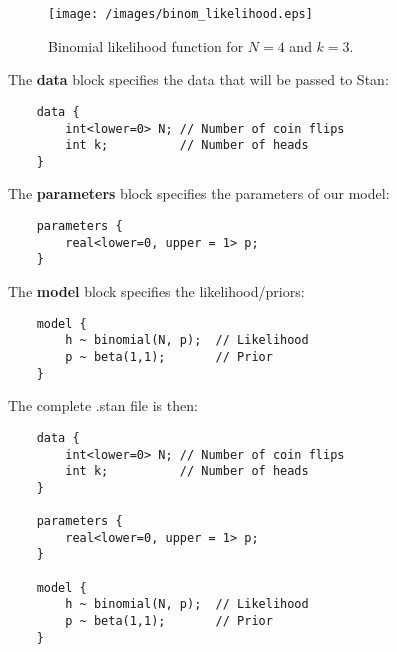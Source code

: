 \documentclass{beamer}
\begin{document}
\begin{frame}
    \begin{figure}
    \centering
        \texttt{[image: /images/binom\_likelihood.eps]}
        \caption{Binomial likelihood function for $N=4$ and $k=3$.}
    \end{figure}
\end{frame}

\begin{frame}[fragile]
The \textbf{data} block specifies the data that will be passed to Stan:
\begin{verbatim}
    data {
        int<lower=0> N; // Number of coin flips
        int k;          // Number of heads
    }
\end{verbatim}
\end{frame}

\begin{frame}[fragile]
The \textbf{parameters} block specifies the parameters of our model:
\begin{verbatim}
    parameters {
        real<lower=0, upper = 1> p;
    }
\end{verbatim}
\end{frame}

\begin{frame}[fragile]
The \textbf{model} block specifies the likelihood/priors:
\begin{verbatim}
    model {
        h ~ binomial(N, p);  // Likelihood
        p ~ beta(1,1);       // Prior
    }
\end{verbatim}
\end{frame}

\begin{frame}[fragile]
The complete .stan file is then:
\begin{verbatim}
    data {
        int<lower=0> N; // Number of coin flips
        int k;          // Number of heads
    }
    
    parameters {
        real<lower=0, upper = 1> p;
    }
    
    model {
        h ~ binomial(N, p);  // Likelihood
        p ~ beta(1,1);       // Prior
    }
\end{verbatim}
\end{frame}
\end{document}
